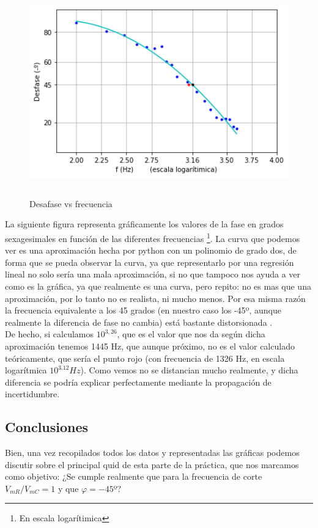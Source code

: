 \documentclass[10pt,a4paper]{article}
\begin{document}
\begin{figure}[h] %

\center
\includegraphics[width=12cm, height=9cm]{Plot2}
\caption{Desafase vs frecuencia}
\label{fig: Desfase vs frecuencia}
\end{figure}

La siguiente figura representa gráficamente los valores de la fase en grados sexagesimales en función de las diferentes frecuencias \footnote{En escala logarítimica}. La curva que podemos ver es una aproximación hecha por python con un polinomio de grado dos, de forma que se pueda observar la curva, ya que representarlo por una regresión lineal no solo sería una mala aproximación, si no que tampoco nos ayuda a ver como es la gráfica, ya que realmente es una curva, pero repito: no es mas que una aproximación, por lo tanto no es realista, ni mucho menos. Por esa misma razón la frecuencia equivalente a los 45 grados (en nuestro caso los -45º, aunque realmente la diferencia de fase no cambia) está bastante distorsionada . \\

De hecho, si calculamos $10^{3,26}$, que es el valor que nos da según dicha aproximación tenemos 1445 Hz, que aunque próximo, no es el valor calculado teóricamente, que sería el punto rojo (con frecuencia de 1326 Hz, en escala logarítmica $10^{3.12} Hz$). Como vemos no se distancian mucho realmente, y dicha diferencia se podría explicar perfectamente mediante la propagación de incertidumbre. \\

\subsection{Conclusiones}
Bien, una vez recopilados todos los datos y representadas las gráficas podemos discutir sobre el principal quid de esta parte de la práctica, que nos marcamos como objetivo: ¿Se cumple realmente que para la frecuencia de corte $V_{mR}/V_{mC}=1$ y que $\varphi = -45$º? \\
\end{document}
